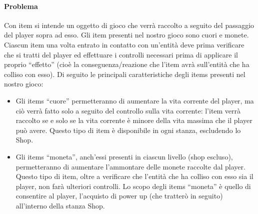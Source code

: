 \documentclass[a4paper,12pt]{report}
\begin{document}
\paragraph*{Problema}
	Con item si intende un oggetto di gioco che verrà raccolto a seguito del passaggio del player sopra ad esso. Gli item presenti nel nostro gioco sono cuori e monete.
	Ciascun item una volta entrato in contatto con un'entità deve prima verificare che si tratti del player ed effettuare i controlli necessari prima di applicare il proprio “effetto” (cioè la conseguenza/reazione che l'item avrà sull'entità che ha colliso con esso).
	Di seguito le principali caratteristiche degli items presenti nel nostro gioco:
	\begin{itemize}
		\item Gli items “cuore” permetteranno di aumentare la vita corrente del player, ma ciò verrà fatto solo a seguito del controllo sulla vita corrente: l'item verrà raccolto se e solo se la vita corrente è minore della vita massima che il player può avere. Questo tipo di item è disponibile in ogni stanza, escludendo lo Shop.
		\item Gli items “moneta”, anch'essi presenti in ciascun livello (shop escluso), permetteranno di aumentare l'ammontare delle monete raccolte dal player. Questo tipo di item, oltre a verificare che l'entità che ha colliso con esso sia il player, non farà ulteriori controlli. Lo scopo degli items “moneta” è quello di consentire al player, l'acquisto di power up (che tratterò in seguito) all'interno della stanza Shop.
	\end{itemize}
\end{document}
